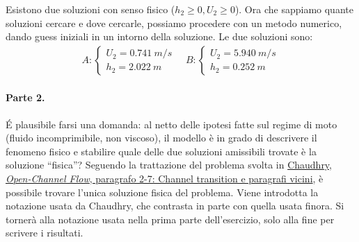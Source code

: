 Esistono due soluzioni con senso fisico ($h_2 \ge 0, U_2 \ge 0$). Ora che sappiamo quante soluzioni cercare e dove cercarle, possiamo procedere con un metodo numerico, dando guess iniziali in un intorno della soluzione.
Le due soluzioni sono:
\begin{equation}
\begin{aligned}
  A :
  \begin{cases}
   U_2 = 0.741 \ m/s \\
   h_2 = 2.022 \ m
  \end{cases}
   \quad
  B :
  \begin{cases}
   U_2 = 5.940 \ m/s \\
   h_2 = 0.252 \ m
  \end{cases}
\end{aligned}
\end{equation}

\paragraph{Parte 2.}
\'E plausibile farsi una domanda: al netto delle ipotesi fatte sul regime di
 moto (fluido incomprimibile, non viscoso), il modello è in grado di
 descrivere il fenomeno fisico e stabilire quale delle due soluzioni 
 amissibili trovate è la soluzione ``fisica''?
Seguendo la trattazione del problema svolta in \href{http://heidarpour.iut.ac.ir/sites/heidarpour.iut.ac.ir/files//u32/open-chaudhry.pdf}{Chaudhry, \textit{Open-Channel Flow}, paragrafo 2-7: Channel transition e paragrafi vicini},
 è possibile trovare l'unica soluzione fisica del problema.
 Viene introdotta la notazione usata da Chaudhry, che contrasta in parte
 con quella usata finora. Si tornerà alla notazione usata nella prima parte
 dell'esercizio, solo alla fine per scrivere i risultati.

